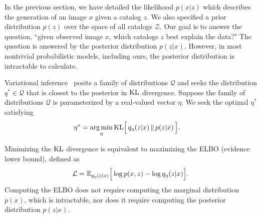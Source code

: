 In the previous section, we have detailed the likelihood $p(x | z)$ which describes the generation of an image $x$ given a catalog $z$. We also specified a prior distribution $p(z)$ over the space 
of all catalogs $\mathcal{Z}$. 
Our goal is to answer the question, ``given observed image $x$, which 
catalogs $z$ best explain the data?"
The question is answered by the posterior distribution $p(z | x)$. However,  in most
nontrivial probabilistic models, including ours, the posterior distribution is intractable to calculate.

Variational inference~\cite{Blei_2017_vi_review, Jordan_intro_vi, Wainwrite_graph_models_vi}
posits a family of distributions $\mathcal{Q}$ and seeks
the distribution $q^*\in \mathcal{Q}$ that is closest to the posterior
in $\textrm{KL}$ divergence. Suppose the family of distributions $\mathcal{Q}$ is parameterized by a real-valued vector $\eta$. We seek the optimal $\eta^*$ 
satisfying
\begin{align}
   \eta^* &= \operatorname*{arg\,min}_{\eta} \mathrm{KL}\Big[\,q_\eta(z | x)\, \| \,p(z | x )\,\Big].
   \label{eq:kl_objective}
\end{align}

Minimizing the $\textrm{KL}$ divergence is equivalent to maximizing the ELBO (evidence lower bound), defined as 
\begin{align}
    \mathcal{L} = 
    \mathbb{E}_{q_\eta(z | x)}\Big[\log p(x, z) - \log q_\eta(z | x)\Big].
    \label{eq:elbo}
\end{align}
Computing the ELBO does not require computing the marginal distribution $p(x)$, which is intractable, nor does it
require computing the posterior distribution $p(z | x)$.

